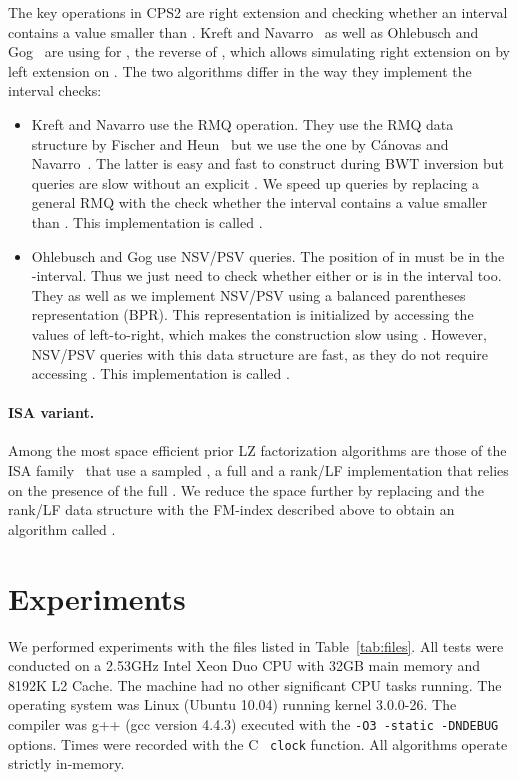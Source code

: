 \documentclass[runningheads]{llncs}
\begin{document}
{The key operations in CPS2 are right extension and checking
whether an  interval contains a value smaller than .  Kreft
and Navarro~\cite{kn2010} as well as Ohlebusch and Gog~\cite{og2011}
are using  for , the reverse of , 
which allows simulating right extension
on  by left extension on . The
two algorithms differ in the way they implement the interval checks:
\begin{itemize}
\item Kreft and Navarro use the RMQ operation. They use the RMQ data
  structure by Fischer and Heun~\cite{fh2007} but we use the one by
  C{\'a}novas and Navarro~\cite{cn2010}. The latter is easy and fast to
  construct during BWT inversion but queries are slow without an
  explicit . We speed up queries by replacing a general RMQ with
  the check whether the interval contains a value smaller than .
  This implementation is called .
\item Ohlebusch and Gog use NSV/PSV queries. The position  of 
  in  must be in the -interval. Thus we just need
  to check whether either  or  is in the interval
  too. They as well as we implement NSV/PSV using a balanced
  parentheses representation (BPR). This representation is initialized
  by accessing the values of  left-to-right, which makes the
  construction slow using . However, NSV/PSV queries with this data
  structure are fast, as they do not require accessing .
  This implementation is called .
\end{itemize}

\paragraph{ISA variant.} Among the most space efficient prior LZ
factorization algorithms are those of the ISA
family~\cite{kp2013} that use a sampled , a full  and a
rank/LF implementation that relies on the presence of the full
. We reduce the space further by replacing  and the rank/LF
data structure with the FM-index described above to obtain an
algorithm called .

\clearpage

\section{Experiments}
\label{sec-experiments}

We performed experiments with 
the files listed in Table~\ref{tab:files}.  All tests were conducted
on a 2.53GHz Intel Xeon Duo CPU with 32GB main memory and 8192K L2
Cache. The machine had no other significant CPU tasks running. The
operating system was Linux (Ubuntu 10.04) running kernel 3.0.0-26. The
compiler was g++ (gcc version 4.4.3) executed with the {\tt -O3
  -static -DNDEBUG} options. Times were recorded with the C {\tt
  clock} function. All algorithms operate strictly in-memory.

}
\end{document}
